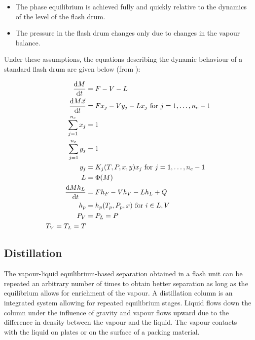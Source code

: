 \begin{itemize}
\item The phase equilibrium is achieved fully and quickly relative to
  the dynamics of the level of the flash drum.
\item The pressure in the flash drum changes only due to changes in
  the vapour balance.
\end{itemize}

Under these assumptions, the equations describing the dynamic
behaviour of a standard flash drum are given below (from \citet{eich-soellner.lory.ea1997stationary}):

\begin{align}
  \frac{\mathrm{d} M}{\mathrm{d} t}          & = F - V - L                                         \\
  \frac{\mathrm{d} M\vec{x}}{\mathrm{d} t}   & = Fx_j - Vy_j - Lx_j \text{ for } j = 1,\dots,n_c-1 \\
  \sum_{j=1}^{n_c} x_j & = 1                                                 \\
  \sum_{j=1}^{n_c} y_j & = 1                                                 \\
  y_j                  & = K_j(T, P, x, y)x_j \text{ for } j = 1,\dots,n_c-1 \\
  L                    & = \Phi(M)                                           \\
  \frac{\mathrm{d} Mh_L}{\mathrm{d} t}       & = Fh_F - Vh_V - Lh_L + Q                            \\
  h_p                  & = h_p(T_p, P_p, x) \text{ for } i \in {L, V}        \\
  P_V                  & = P_L = P                                           \\
  T_V=T_L=T
\end{align}

\subsection{Distillation}

The vapour-liquid equilibrium-based separation obtained in a flash unit can be
repeated an arbitrary number of times to obtain better separation as
long as the equilibrium allows for enrichment of the vapour.  A
distillation column is an integrated system allowing for repeated
equilibrium stages.  Liquid flows down the column under the influence
of gravity and vapour flows upward due to the difference in density
between the vapour and the liquid.  The vapour contacts with the
liquid on plates or on the surface of a packing material.  

